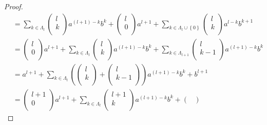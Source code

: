 \documentclass[dvipdfmx]{jsarticle}
\begin{document}
\begin{proof}
\begin{align*}
&= \sum_{k \in \varLambda_{l}} {\begin{pmatrix}
l \\
k \\
\end{pmatrix}a^{(l + 1) - k}b^{k}} + \begin{pmatrix}
l \\
0 \\
\end{pmatrix}a^{l + 1} + \sum_{k \in \varLambda_{l} \cup \left\{ 0 \right\}} {\begin{pmatrix}
l \\
k \\
\end{pmatrix}a^{l - k}b^{k + 1}}\\
&= \begin{pmatrix}
l \\
0 \\
\end{pmatrix}a^{l + 1} + \sum_{k \in \varLambda_{l}} {\begin{pmatrix}
l \\
k \\
\end{pmatrix}a^{(l + 1) - k}b^{k}} + \sum_{k \in \varLambda_{l + 1}} {\begin{pmatrix}
l \\
k - 1 \\
\end{pmatrix}a^{(l + 1) - k}b^{k}}\\
&= a^{l + 1} + \sum_{k \in \varLambda_{l}} {\left( \begin{pmatrix}
l \\
k \\
\end{pmatrix} + \begin{pmatrix}
l \\
k - 1 \\
\end{pmatrix} \right)a^{(l + 1) - k}b^{k}} + b^{l + 1}\\
&= \begin{pmatrix}
l + 1 \\
0 \\
\end{pmatrix}a^{l + 1} + \sum_{k \in \varLambda_{l}} {\begin{pmatrix}
l + 1 \\
k \\
\end{pmatrix}a^{(l + 1) - k}b^{k}} + \begin{pmatrix}

\end{pmatrix}
\end{align*}
\end{proof}
\end{document}
